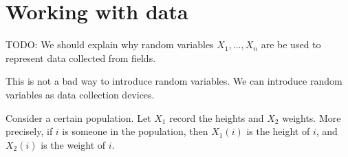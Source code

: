 \documentclass[../main.tex]{subfiles}
\begin{document}
 \section{Working with data}

TODO: We should explain why random variables \(X_{1}, \ldots, X_{n}\) are be used to represent data collected from fields.

This is not a bad way to introduce random variables. We can introduce random variables as data collection devices.

Consider a certain population. Let \(X_{1}\) record the heights and \(X_{2}\) weights. More precisely, if \(i\) is someone in the population, then \(X_{1}(i)\) is the height of \(i\), and \(X_{2}(i)\) is the weight of \(i\).
\end{document}
